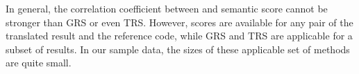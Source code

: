 In general, the correlation coefficient between {\model} and semantic score cannot be 
stronger than GRS or even TRS. However, {\model} scores are available for any pair 
of the translated result and the reference code, while GRS and TRS are applicable for 
a subset of results. In our sample data, the sizes of these applicable set of methods
are quite small.



